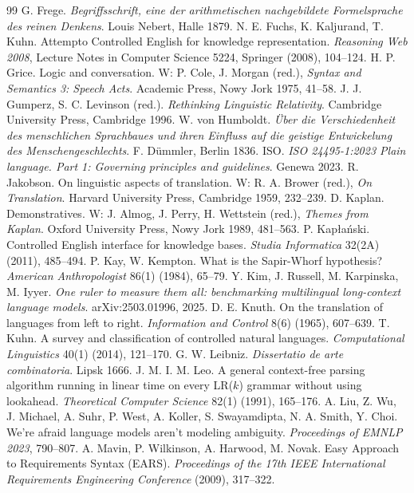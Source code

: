 \documentclass[11pt,a4paper]{article}
\begin{document}
\begin{thebibliography}{99}
 G. Frege. \emph{Begriffsschrift, eine der arithmetischen nachgebildete Formelsprache des reinen Denkens}. Louis Nebert, Halle 1879.
 N. E. Fuchs, K. Kaljurand, T. Kuhn. Attempto Controlled English for knowledge representation. \emph{Reasoning Web 2008}, Lecture Notes in Computer Science 5224, Springer (2008), 104--124.
 H. P. Grice. Logic and conversation. W: P. Cole, J. Morgan (red.), \emph{Syntax and Semantics 3: Speech Acts}. Academic Press, Nowy Jork 1975, 41--58.
 J. J. Gumperz, S. C. Levinson (red.). \emph{Rethinking Linguistic Relativity}. Cambridge University Press, Cambridge 1996.
 W. von Humboldt. \emph{Über die Verschiedenheit des menschlichen Sprachbaues und ihren Einfluss auf die geistige Entwickelung des Menschengeschlechts}. F. Dümmler, Berlin 1836.
 ISO. \emph{ISO 24495-1:2023 Plain language. Part 1: Governing principles and guidelines}. Genewa 2023.
 R. Jakobson. On linguistic aspects of translation. W: R. A. Brower (red.), \emph{On Translation}. Harvard University Press, Cambridge 1959, 232--239.
 D. Kaplan. Demonstratives. W: J. Almog, J. Perry, H. Wettstein (red.), \emph{Themes from Kaplan}. Oxford University Press, Nowy Jork 1989, 481--563.
 P. Kapłański. Controlled English interface for knowledge bases. \emph{Studia Informatica} 32(2A) (2011), 485--494.
 P. Kay, W. Kempton. What is the Sapir-Whorf hypothesis? \emph{American Anthropologist} 86(1) (1984), 65--79.
 Y. Kim, J. Russell, M. Karpinska, M. Iyyer. \emph{One ruler to measure them all: benchmarking multilingual long-context language models}. arXiv:2503.01996, 2025.
 D. E. Knuth. On the translation of languages from left to right. \emph{Information and Control} 8(6) (1965), 607--639.
 T. Kuhn. A survey and classification of controlled natural languages. \emph{Computational Linguistics} 40(1) (2014), 121--170.
 G. W. Leibniz. \emph{Dissertatio de arte combinatoria}. Lipsk 1666.
 J. M. I. M. Leo. A general context-free parsing algorithm running in linear time on every LR($k$) grammar without using lookahead. \emph{Theoretical Computer Science} 82(1) (1991), 165--176.
 A. Liu, Z. Wu, J. Michael, A. Suhr, P. West, A. Koller, S. Swayamdipta, N. A. Smith, Y. Choi. We're afraid language models aren't modeling ambiguity. \emph{Proceedings of EMNLP 2023}, 790--807.
 A. Mavin, P. Wilkinson, A. Harwood, M. Novak. Easy Approach to Requirements Syntax (EARS). \emph{Proceedings of the 17th IEEE International Requirements Engineering Conference} (2009), 317--322.

\end{thebibliography}
\end{document}
